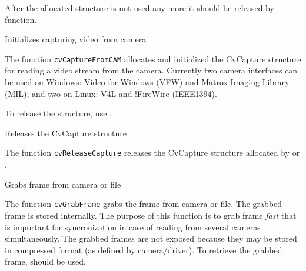 After the allocated structure is not used any more it should be released by  function.


Initializes capturing video from camera


\begin{description}
\end{description}

The function \texttt{cvCaptureFromCAM} allocates and initialized the CvCapture structure for reading a video stream from the camera. Currently two camera interfaces can be used on Windows: Video for Windows (VFW) and Matrox Imaging Library (MIL); and two on Linux: V4L and !FireWire (IEEE1394).

To release the structure, use .


Releases the CvCapture structure


\begin{description}
\end{description}

The function \texttt{cvReleaseCapture} releases the CvCapture structure allocated by  or .


Grabs frame from camera or file


\begin{description}
\end{description}

The function \texttt{cvGrabFrame} grabs the frame from camera or file. The grabbed frame is stored internally. The purpose of this function is to grab frame \emph{fast} that is important for syncronization in case of reading from several cameras simultaneously. The grabbed frames are not exposed because they may be stored in compressed format (as defined by camera/driver). To retrieve the grabbed frame,  should be used.

